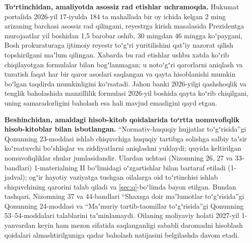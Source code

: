 \documentclass[14pt,a4paper]{extarticle}
\begin{document}
\textbf{Toʻrtinchidan, amaliyotda asossiz rad etishlar uchramoqda.} Hukumat portalida 2026-yil 17-iyulda 184 ta mahallada bir oy ichida kelgan 2 ming arizaning barchasi asossiz rad qilingani, reyestrga kirish masalasida Prezidentga murojaatlar yil boshidan 1,5 barobar oshib, 30 mingdan 46 mingga koʻpaygani, Bosh prokuraturaga ijtimoiy reyestr toʻgʻri yuritilishini qatʼiy nazorat qilish topshirilgani maʼlum qilingan\cite{govuz}. Xabarda bu rad etishlar ushbu xatda koʻrib chiqilayotgan formulalar bilan bogʻlanmagan; u notoʻgʻri qarorlarni aniqlash va tuzatish faqat har bir qaror asoslari saqlangan va qayta hisoblanishi mumkin boʻlgan taqdirda mumkinligini koʻrsatadi. Jahon banki 2026-yilgi qashshoqlik va tenglik baholashida manzillilik formulasi 2026-yil boshida qayta koʻrib chiqilgani, uning samaradorligini baholash esa hali mavjud emasligini qayd etgan\cite{wb2026}.

\textbf{Beshinchidan, amaldagi hisob-kitob qoidalarida toʻrtta nomuvofiqlik hisob-kitoblar bilan isbotlangan.} “Normativ-huquqiy hujjatlar toʻgʻrisida”gi Qonunning 23-moddasi ishlab chiquvchiga huquqiy tartibga solishga salbiy taʼsir koʻrsatuvchi boʻshliqlar va ziddiyatlarni aniqlashni yuklaydi\cite{orq682}; quyida keltirilgan nomuvofiqliklar shular jumlasidandir. Ulardan uchtasi (Nizomning 26, 27 va 33-bandlari) 1-materialning II boʻlimidagi oʻzgartishlar bilan bartaraf etiladi (1-jadval); ogʻir hayotiy vaziyatga tushgan oilalarga oid toʻrtinchisi ishlab chiquvchining qarorini talab qiladi va \ref{sec:q}-boʻlimda bayon etilgan. Bundan tashqari, Nizomning 37 va 44-bandlari “Shaxsga doir maʼlumotlar toʻgʻrisida”gi Qonunning 24-moddasi va “Maʼmuriy tartib-taomillar toʻgʻrisida”gi Qonunning 53–54-moddalari talablarini taʼminlamaydi. Oilaning moliyaviy holati 2027-yil 1-yanvardan keyin ham mezon sifatida saqlanganligi sababli daromadni hisoblash qoidalari almashtirilguniga qadar baholash natijasini belgilashda davom etadi.
\end{document}
